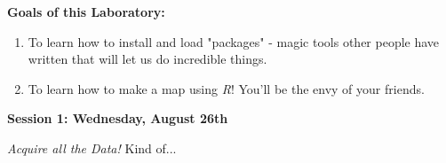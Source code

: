 \documentclass{article}
\begin{document}
\vspace{4mm}

\setlength{\leftskip}{0cm}

\large{\textbf{Goals of this Laboratory:}}

\begin{enumerate}[leftmargin=15mm]

\item To learn how to install and load "packages" - magic tools other people have written that will let us do incredible things.

\item To learn how to make a map using \textit{R}!  You'll be the envy of your friends.

\end{enumerate}









\large{\textbf{Session 1: Wednesday, August 26th}}

\vspace{4mm}
\setlength{\leftskip}{1cm}
\textit{Acquire all the Data!} {\tiny Kind of...}
\end{document}
